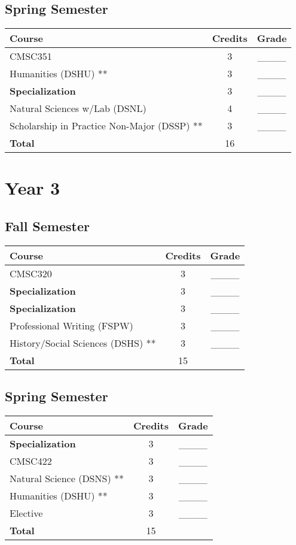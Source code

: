 \subsection*{Spring Semester}
\begin{tabular}{|l|c|c|}
    \hline
    Course & Credits & Grade \\
    \hline
    CMSC351 & 3 & \_\_\_\_ \\
    Humanities (DSHU) ** & 3 & \_\_\_\_ \\
    \textbf{Specialization} & 3 & \_\_\_\_ \\
    Natural Sciences w/Lab (DSNL) & 4 & \_\_\_\_ \\
    Scholarship in Practice Non-Major (DSSP) ** & 3 & \_\_\_\_ \\
    \hline
    \textbf{Total} & 16 & \\
    \hline
\end{tabular}

\section*{Year 3}
\subsection*{Fall Semester}
\begin{tabular}{|l|c|c|}
    \hline
    Course & Credits & Grade \\
    \hline
    CMSC320 & 3 & \_\_\_\_ \\
     \textbf{Specialization} & 3 & \_\_\_\_ \\
     \textbf{Specialization} & 3 & \_\_\_\_ \\
    Professional Writing (FSPW) & 3 & \_\_\_\_ \\
History/Social Sciences (DSHS) ** & 3 & \_\_\_\_ \\
    \hline
    \textbf{Total} & 15 & \\
    \hline
\end{tabular}

\subsection*{Spring Semester}
\begin{tabular}{|l|c|c|}
    \hline
    Course & Credits & Grade \\
    \hline
    \textbf{Specialization} & 3 & \_\_\_\_ \\
   CMSC422 & 3 & \_\_\_\_ \\
   Natural Science (DSNS) ** & 3 & \_\_\_\_ \\
Humanities (DSHU) ** & 3 & \_\_\_\_ \\
Elective & 3 & \_\_\_\_ \\
    \hline
    \textbf{Total} & 15 & \\
    \hline
\end{tabular}

